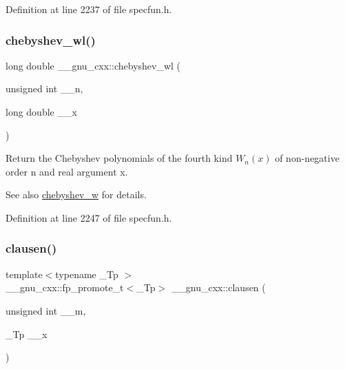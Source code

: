 Definition at line 2237 of file specfun.\+h.

\mbox{\label{group__mathsf__gnu_ga1297dfd9b9a0f584435de7d83eb9e9c3}} 
\subsubsection{\texorpdfstring{chebyshev\+\_\+wl()}{chebyshev\_wl()}}
{\footnotesize\ttfamily long double \+\_\+\+\_\+gnu\+\_\+cxx\+::chebyshev\+\_\+wl (\begin{DoxyParamCaption}\item[{unsigned int}]{\+\_\+\+\_\+n,  }\item[{long double}]{\+\_\+\+\_\+x }\end{DoxyParamCaption})\hspace{0.3cm}{\ttfamily [inline]}}

Return the Chebyshev polynomials of the fourth kind $ W_n(x) $ of non-\/negative order {\ttfamily n} and real argument {\ttfamily x}.

\begin{DoxySeeAlso}{See also}
\hyperlink{group__mathsf__gnu_gaa156c6c21e99104ebcb627e92aceada0}{chebyshev\+\_\+w} for details. 
\end{DoxySeeAlso}


Definition at line 2247 of file specfun.\+h.

\mbox{\label{group__mathsf__gnu_ga54e4ba71b1f81718d6998349f91ff88f}} 
\subsubsection{\texorpdfstring{clausen()}{clausen()}\hspace{0.1cm}{\footnotesize\ttfamily [1/2]}}
{\footnotesize\ttfamily template$<$typename \+\_\+\+Tp $>$ \\
\+\_\+\+\_\+gnu\+\_\+cxx\+::fp\+\_\+promote\+\_\+t$<$\+\_\+\+Tp$>$ \+\_\+\+\_\+gnu\+\_\+cxx\+::clausen (\begin{DoxyParamCaption}\item[{unsigned int}]{\+\_\+\+\_\+m,  }\item[{\+\_\+\+Tp}]{\+\_\+\+\_\+x }\end{DoxyParamCaption})\hspace{0.3cm}{\ttfamily [inline]}}

